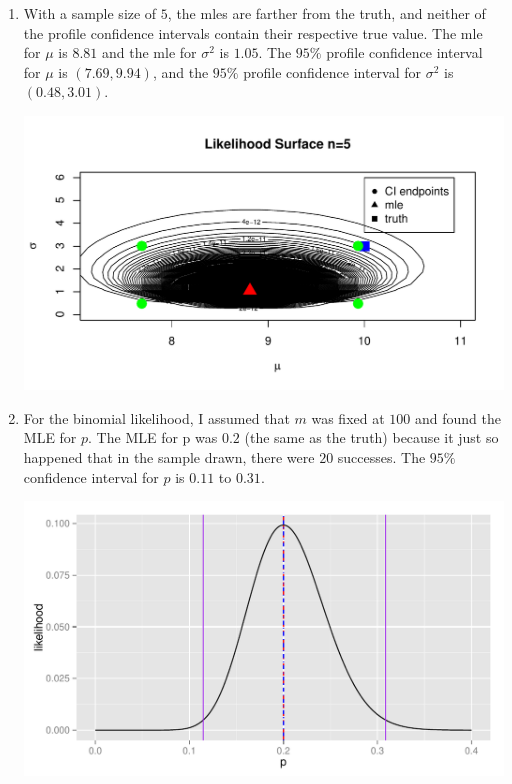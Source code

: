 \documentclass[12pt]{article}\usepackage[]{graphicx}\usepackage[]{color}
\newenvironment{knitrout}{}{} %
\begin{document}
\begin{doublespacing}
\begin{enumerate}
\begin{enumerate}
\item With a sample size of $5$, the mles are farther from the truth, and neither of the profile confidence intervals contain their respective true value. The mle for $\mu$ is $8.81$ and the mle for $\sigma^2$ is $1.05$. The $95\%$ profile confidence interval for $\mu$ is $(7.69, 9.94)$, and the $95\%$ profile confidence interval for $\sigma^2$ is $(0.48, 3.01)$.

\begin{knitrout}\footnotesize
{}\color{fgcolor}
\includegraphics[width=0.8\linewidth]{figure/normal5-1} 

\end{knitrout}

\item For the binomial likelihood, I assumed that $m$ was fixed at $100$ and found the MLE for $p$. The MLE for p was $0.2$ (the same as the truth) because it just so happened that in the sample drawn, there were $20$ successes. The $95\%$ confidence interval for $p$ is $0.11$ to $0.31$. 

\begin{knitrout}\footnotesize
{}\color{fgcolor}
\includegraphics[width=0.8\linewidth]{figure/binom1-1} 

\end{knitrout}


\end{enumerate}
\end{enumerate}
\end{doublespacing}
\end{document}
